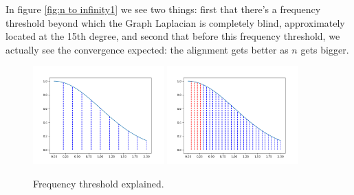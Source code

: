 In figure \ref{fig:n to infinity1} we see two things: first that there's a frequency threshold beyond which the Graph Laplacian is completely blind, approximately located at the 15th degree, and second that before this frequency threshold, we actually see the convergence expected: the alignment gets better as $n$ gets bigger.

\begin{figure}[h!]
	\centering
	\includegraphics[width=0.45\textwidth]{figs/chapter1/frequency_threshold1.png}	\hfill
	\includegraphics[width=0.45\textwidth]{figs/chapter1/frequency_threshold2.png}	
	\caption{\label{fig:n to infinity4}Frequency threshold explained.}
\end{figure}


